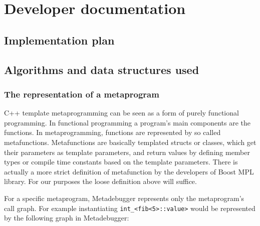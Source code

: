 
\chapter{Developer documentation}

\section{Implementation plan}


\section{Algorithms and data structures used}

\subsection{The representation of a metaprogram}

C++ template metaprogramming can be seen as a form of purely functional
programming. \cite{mihalicza-phd} In functional programming a program's main
components are the functions. In metaprogramming, functions are represented by
so called metafunctions. Metafunctions are basically templated structs or
classes, which get their parameters as template parameters, and return values
by defining member types or compile time constants based on the template
parameters. There is actually a more strict
definition\cite{boost-mpl-metafunction} of metafunction by the developers of
Boost MPL library\cite{boost-mpl}. For our purposes the loose definition above
will suffice.

For a specific metaprogram, Metadebugger represents only the metaprogram's call
graph. For example instantiating \texttt{int\_<fib<5>::value>} would be
represented by the following graph in Metadebugger:

